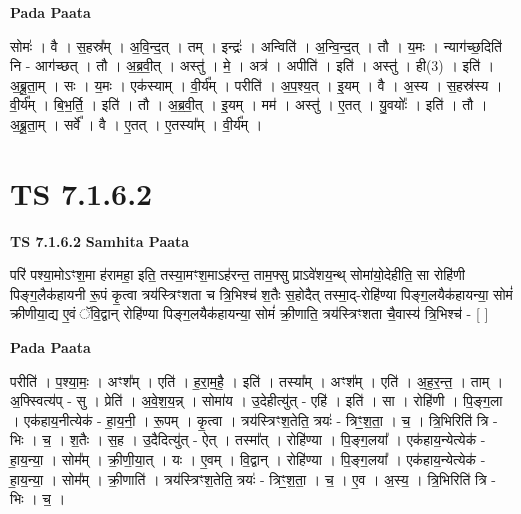 \documentclass[17pt]{extarticle}
\begin{document}
\textbf{Pada Paata} \newline

सोमः॑ । वै । स॒हस्र᳚म् । अ॒वि॒न्द॒त् । तम् । इन्द्रः॑ । अन्विति॑ । अ॒न्वि॒न्द॒त् । तौ । य॒मः । न्याग॑च्छ॒दिति॑ नि - आग॑च्छत् । तौ । अ॒ब्र॒वी॒त् । अस्तु॑ । मे॒ । अत्र॑ । अपीति॑ । इति॑ । अस्तु॑ । ही(3) । इति॑ । अ॒ब्रू॒ता॒म् । सः । य॒मः । एक॑स्याम् । वी॒र्य᳚म् । परीति॑ । अ॒प॒श्य॒त् । इ॒यम् । वै । अ॒स्य । स॒हस्र॑स्य । वी॒र्य᳚म् । बि॒भ॒र्ति॒ । इति॑ । तौ । अ॒ब्र॒वी॒त् । इ॒यम् । मम॑ । अस्तु॑ । ए॒तत् । यु॒वयोः᳚ । इति॑ । तौ । अ॒ब्रू॒ता॒म् । सर्वे᳚ । वै । ए॒तत् । ए॒तस्या᳚म् । वी॒र्य᳚म् ।  \newline





\section{ TS 7.1.6.2 }

\textbf{TS 7.1.6.2 } \newline
\textbf{Samhita Paata} \newline

परि॑ पश्या॒मोऽꣳश॒मा ह॑रामहा॒ इति॒ तस्या॒मꣳश॒माऽह॑रन्त॒ ताम॒फ्सु प्राऽवे॑शय॒न्थ् सोमा॑यो॒देहीति॒ सा रोहि॑णी पिङ्ग॒लैक॑हायनी रू॒पं कृ॒त्वा त्रय॑स्त्रिꣳशता च त्रि॒भिश्च॑ श॒तैः स॒होदैत् तस्मा॒द्-रोहि॑ण्या पिङ्ग॒लयैक॑हायन्या॒ सोमं॑ क्रीणीया॒द्य ए॒वं ॅवि॒द्वान् रोहि॑ण्या पिङ्ग॒लयैक॑हायन्या॒ सोमं॑ क्री॒णाति॒ त्रय॑स्त्रिꣳशता चै॒वास्य॑ त्रि॒भिश्च॑ - [  ] \newline

\textbf{Pada Paata} \newline

परीति॑ । प॒श्या॒मः॒ । अꣳश᳚म् । एति॑ । ह॒रा॒म॒है॒ । इति॑ । तस्या᳚म् । अꣳश᳚म् ।  एति॑ । अ॒ह॒र॒न्त॒ । ताम् । अ॒फ्स्वित्य॑प् - सु । प्रेति॑ । अ॒वे॒श॒य॒न्न् । सोमा॑य । उ॒देहीत्यु॑त् - एहि॑ । इति॑ । सा । रोहि॑णी । पि॒ङ्ग॒ला । एक॑हाय॒नीत्येक॑ - हा॒य॒नी॒ । रू॒पम् । कृ॒त्वा । त्रय॑स्त्रिꣳश॒तेति॒ त्रयः॑ - त्रिꣳ॒॒श॒ता॒ । च॒ । त्रि॒भिरिति॑ त्रि - भिः । च॒ । श॒तैः । स॒ह । उ॒दैदित्यु॑त् - ऐत् । तस्मा᳚त् । रोहि॑ण्या । पि॒ङ्ग॒लया᳚ । एक॑हाय॒न्येत्येक॑ - हा॒य॒न्या॒ । सोम᳚म् । क्री॒णी॒या॒त् । यः । ए॒वम् । वि॒द्वान् । रोहि॑ण्या । पि॒ङ्ग॒लया᳚ । एक॑हाय॒न्येत्येक॑ - हा॒य॒न्या॒ । सोम᳚म् । क्री॒णाति॑ । त्रय॑स्त्रिꣳश॒तेति॒ त्रयः॑ - त्रिꣳ॒॒श॒ता॒ । च॒ । ए॒व । अ॒स्य॒ । त्रि॒भिरिति॑ त्रि - भिः । च॒ ।  \newline




\end{document}
